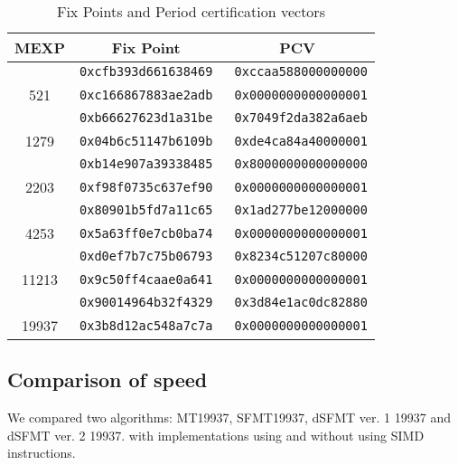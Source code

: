 \documentclass{svmult}
\begin{document}

\begin{table}
  \begin{center}
    \caption{Fix Points and Period certification vectors}
    \label{tab:pcv}
    \begin{tabular}{c|rr} \hline
      MEXP & \multicolumn{1}{c}{Fix Point} 
      & \multicolumn{1}{c}{PCV} \\ \hline \hline
      & \texttt{0xcfb393d661638469} & \texttt{0xccaa588000000000} \\
      521 & \texttt{0xc166867883ae2adb} &\texttt{ 0x0000000000000001} \\ \hline
      & \texttt{0xb66627623d1a31be} & \texttt{0x7049f2da382a6aeb} \\
      1279 & \texttt{0x04b6c51147b6109b} & \texttt{0xde4ca84a40000001} \\ \hline
      & \texttt{0xb14e907a39338485} & \texttt{0x8000000000000000} \\
      2203 & \texttt{0xf98f0735c637ef90} & \texttt{0x0000000000000001} \\ \hline
      & \texttt{0x80901b5fd7a11c65} & \texttt{0x1ad277be12000000} \\
      4253 & \texttt{0x5a63ff0e7cb0ba74} & \texttt{0x0000000000000001} \\ \hline
      & \texttt{0xd0ef7b7c75b06793} & \texttt{0x8234c51207c80000} \\
      11213 & \texttt{0x9c50ff4caae0a641} & \texttt{0x0000000000000001}\\ \hline
      & \texttt{0x90014964b32f4329} & \texttt{0x3d84e1ac0dc82880} \\
      19937 & \texttt{0x3b8d12ac548a7c7a} & \texttt{0x0000000000000001} \\ 
      \hline
    \end{tabular}
  \end{center}
\end{table}

\subsection{Comparison of speed}\label{sec:comp-speed}
We compared two algorithms: MT19937, SFMT19937, dSFMT ver. 1 19937
and dSFMT ver. 2 19937.
with implementations using and without using SIMD instructions.
\end{document}
